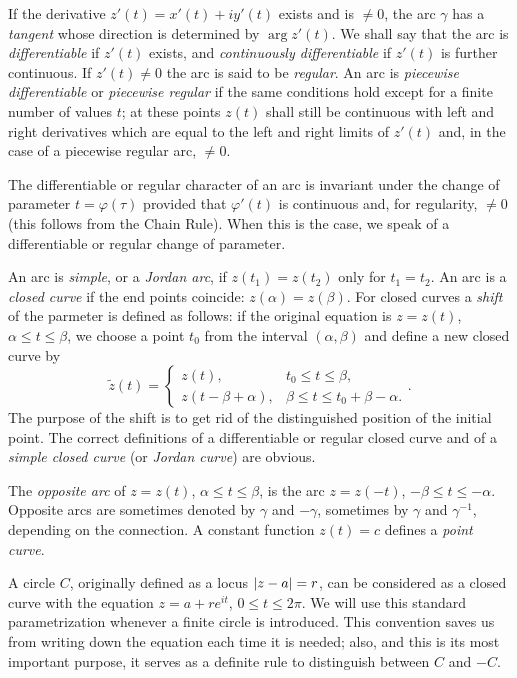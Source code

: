 If the derivative $z'(t)=x'(t)+iy'(t)$ exists and is $\neq 0$, the arc $\gamma$ has a \emph{tangent} whose direction is determined by $\arg z'(t)$. We shall say that the arc is \emph{differentiable} if $z'(t)$ exists, and \emph{continuously differentiable} if $z'(t)$ is further continuous. If $z'(t) \neq 0$ the arc is said to be \emph{regular}. An arc is \emph{piecewise differentiable} or \emph{piecewise regular} if the same conditions hold except for a finite number of values $t$; at these points $z(t)$ shall still be continuous with left and right derivatives which are equal to the left and right limits of $z'(t)$ and, in the case of a piecewise regular arc, $\neq 0$.

The differentiable or regular character of an arc is invariant under the change of parameter $t=\varphi(\tau)$ provided that $\varphi'(t)$ is continuous and, for regularity, $\neq 0$ (this follows from the Chain Rule). When this is the case, we speak of a differentiable or regular change of parameter.

An arc is \emph{simple}, or a \emph{Jordan arc}, if $z(t_1)=z(t_2)$ only for $t_1=t_2$. An arc is a \emph{closed curve} if the end points coincide: $z(\alpha)=z(\beta)$. For closed curves a \emph{shift} of the parmeter is defined as follows: if the original equation is $z=z(t)$, $\alpha \le t \le \beta$, we choose a point $t_0$ from the interval $(\alpha,\beta)$ and define a new closed curve by $$\tilde{z}(t)=\begin{cases}
	z(t), & t_0 \le t \le \beta, \\
	z(t-\beta+\alpha), & \beta \le t \le t_0+\beta-\alpha.
\end{cases}.$$ The purpose of the shift is to get rid of the distinguished position of the initial point. The correct definitions of a differentiable or regular closed curve and of a \emph{simple closed curve} (or \emph{Jordan curve}) are obvious.

The \emph{opposite arc} of $z=z(t)$, $\alpha \le t \le \beta$, is the arc $z=z(-t)$, $-\beta \le t \le -\alpha$. Opposite arcs are sometimes denoted by $\gamma$ and $-\gamma$, sometimes by $\gamma$ and $\gamma^{-1}$, depending on the connection. A constant function $z(t)=c$ defines a \emph{point curve}.

A circle $C$, originally defined as a locus $\lvert z-a \rvert=r$, can be considered as a closed curve with the equation $z=a+re^{it}$, $0 \le t \le 2\pi$. We will use this standard parametrization whenever a finite circle is introduced. This convention saves us from writing down the equation each time it is needed; also, and this is its most important purpose, it serves as a definite rule to distinguish between $C$ and $-C$.

